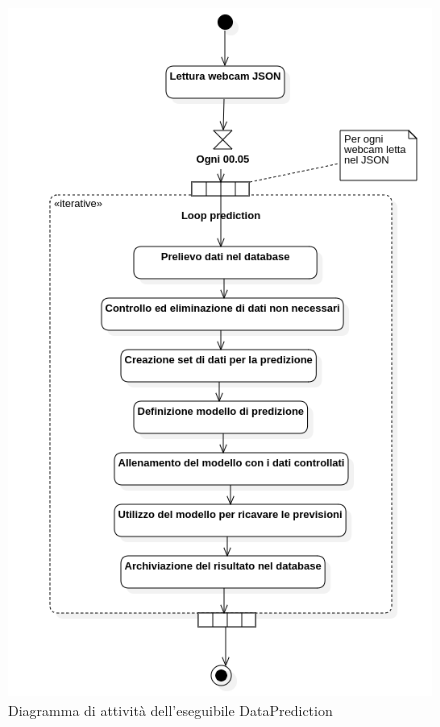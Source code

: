 \begin{figure}[H]
  \begin{center}
    \includegraphics[scale=0.6]{../immagini/diag_PB/prediction_activity.png}
    \caption{Diagramma di attività dell'eseguibile DataPrediction}
  \end{center}
\end{figure}



